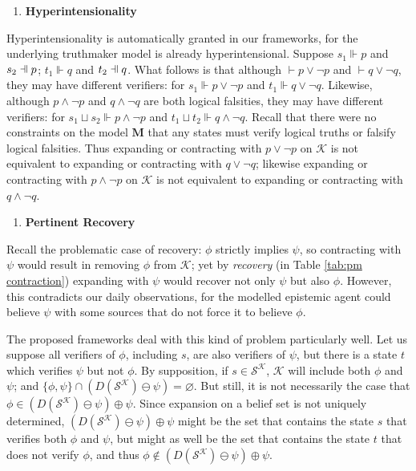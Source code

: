 \documentclass[12pt]{article}
\newcommand{\fal}{\mathrel{\text{\reflectbox{$\Vdash$}}}}
\newcommand{\ver}{\Vdash}
\newcommand{\K}{\mathcal{K}}
\newcommand{\SK}{\mathcal{S}^\mathcal{K}}
\begin{document}
\begin{enumerate}
    \item[(D5)] \textbf{Hyperintensionality}
\end{enumerate}
Hyperintensionality is automatically granted in our frameworks, for the underlying truthmaker model is already hyperintensional. Suppose $s_1 \ver p$ and $s_2 \fal p$; $t_1 \ver q$ and $t_2 \fal q$. What follows is that although $\vdash p \lor \lnot p$ and $\vdash q \lor \lnot q$, they may have different verifiers: for $s_1 \ver p \lor \lnot p$ and $t_1 \ver q \lor \lnot q$. Likewise, although $p \land \lnot p$ and $q \land \lnot q$ are both logical falsities, they may have different verifiers: for $s_1 \sqcup s_2 \ver p \land \lnot p$ and $t_1 \sqcup t_2 \ver q \land \lnot q$. Recall that there were no constraints on the model $\bm{M}$ that any states must verify logical truths or falsify logical falsities. Thus expanding or contracting with $p \lor \lnot p$ on $\K$ is not equivalent to expanding or contracting with $q \lor \lnot q$; likewise expanding or contracting with $p \land \lnot p$ on $\K$ is not equivalent to expanding or contracting with $q \land \lnot q$. 
\begin{enumerate}
    \item[(D6)] \textbf{Pertinent Recovery}
\end{enumerate}
Recall the problematic case of recovery: $\phi$ strictly implies $\psi$, so contracting with $\psi$ would result in removing $\phi$ from $\K$; yet by \textit{recovery} (in Table \ref{tab:pm contraction}) expanding with $\psi$ would recover not only $\psi$ but also $\phi$. However, this contradicts our daily observations, for the modelled epistemic agent could believe $\psi$ with some sources that do not force it to believe $\phi$. 
\par
The proposed frameworks deal with this kind of problem particularly well. Let us suppose all verifiers of $\phi$, including $s$, are also verifiers of $\psi$, but there is a state $t$ which verifies $\psi$ but not $\phi$. By supposition, if $s \in \SK$, $\K$ will include both $\phi$ and $\psi$; and $\{\phi, \psi\} \cap (D(\SK) \ominus \psi) = \varnothing$. But still, it is not necessarily the case that $\phi \in (D(\SK) \ominus \psi) \oplus \psi$. Since expansion on a belief set is not uniquely determined, $(D(\SK) \ominus \psi) \oplus \psi$ might be the set that contains the state $s$ that verifies both $\phi$ and $\psi$, but might as well be the set that contains the state $t$ that does not verify $\phi$, and thus $\phi \notin (D(\SK) \ominus \psi) \oplus \psi$. 
\end{document}
